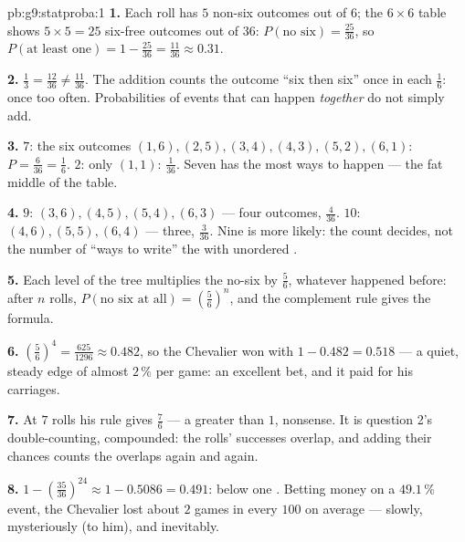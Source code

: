 \begin{solution}{pb:g9:statproba:1}
\textbf{1.} Each roll has $5$ non-six outcomes out of $6$; the
$6 \times 6$ table shows $5 \times 5 = 25$ six-free outcomes out
of $36$: $P(\text{no six}) = \frac{25}{36}$, so
$P(\text{at least one}) = 1 - \frac{25}{36} = \frac{11}{36}
\approx 0.31$.

\textbf{2.} $\frac13 = \frac{12}{36} \neq \frac{11}{36}$. The
addition counts the outcome ``six then six'' once in each
$\frac16$: once too often. Probabilities of events that can
happen \emph{together} do not simply add.

\textbf{3.}  $7$: the six outcomes $(1,6), (2,5), (3,4),
(4,3), (5,2), (6,1)$: $P = \frac{6}{36} = \frac16$.  $2$:
only $(1,1)$: $\frac{1}{36}$. Seven has the most ways to
happen --- the fat middle of the  table.

\textbf{4.}  $9$: $(3,6), (4,5), (5,4), (6,3)$ --- four
outcomes, $\frac{4}{36}$.  $10$: $(4,6), (5,5), (6,4)$ ---
three, $\frac{3}{36}$. Nine is more likely: the count decides,
not the number of ``ways to write'' the  with unordered
.

\textbf{5.} Each level of the tree multiplies the no-six
 by $\frac56$, whatever happened before: after $n$
rolls, $P(\text{no six at all}) = \left(\frac56\right)^n$, and
the complement rule gives the formula.

\textbf{6.} $\left(\frac56\right)^4 = \frac{625}{1296} \approx
0.482$, so the Chevalier won with 
$1 - 0.482 = 0.518$ --- a quiet, steady edge of almost
$2\,\%$ per game: an excellent bet, and it paid for his
carriages.

\textbf{7.} At $7$ rolls his rule gives $\frac76$ --- a
 greater than $1$, nonsense. It is question 2's
double-counting, compounded: the rolls' successes overlap, and
adding their chances counts the overlaps again and again.

\textbf{8.} $1 - \left(\frac{35}{36}\right)^{24} \approx
1 - 0.5086 = 0.491$: below one . Betting  money on a
$49.1\,\%$ event, the Chevalier lost about $2$ games in every
$100$ on average --- slowly, mysteriously (to him), and
inevitably.


\end{solution}
